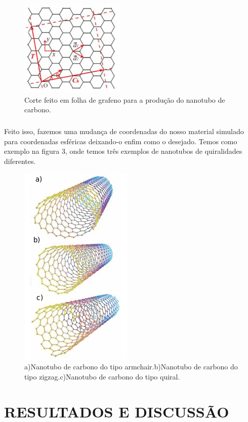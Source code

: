 \documentclass[12pt,a4paper]{report}
\begin{document}
\begin{figure} [!h]
\centering
\includegraphics[scale=1.0]{corte2.png}
\caption{Corte feito em folha de grafeno para a produção do nanotubo de carbono.}
\end{figure}

\paragraph{}
Feito isso, fazemos uma mudança de coordenadas do nosso material simulado para coordenadas esféricas deixando-o enfim como o desejado. Temos como exemplo na figura $3$, onde temos três exemplos de nanotubos de quiralidades diferentes. 

\begin{figure} [!h]
\centering
\includegraphics[scale=0.6]{cntclass.png}
\caption{a)Nanotubo de carbono do tipo armchair.b)Nanotubo de carbono do tipo zigzag.c)Nanotubo de carbono do tipo quiral.}
\end{figure}


\chapter*{RESULTADOS E DISCUSSÃO}
\end{document}
